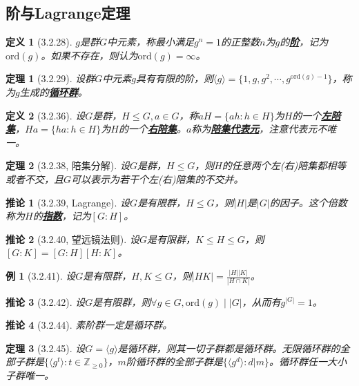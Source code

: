 \documentclass[landscape, a4paper]{article}
\theoremstyle{compact}
\newtheorem{theorem}{定理}
\newtheorem{example}{例}
\newtheorem{corollary}{推论}
\newtheorem{definition}{定义}
\def\obj#1{\textbf{\uline{#1}}}
\def\ord#1{\text{ord}({#1})}
\def\ge{\geqslant}
\begin{document}
\begin{multicols}{3}
\subsection{阶与Lagrange定理}
\begin{definition}[3.2.28]
	$g$是群$G$中元素，称最小满足$g^n=1$的正整数$n$为$g$的\obj{阶}，记为$\ord{g}$。如果不存在，则认为$\ord{g} = \infty$。
\end{definition}
\begin{theorem}[3.2.29]
	设群$G$中元素$g$具有有限的阶，则$\langle g \rangle = \{1, g, g^2, \cdots, g^{\ord{g}-1}\}$，称为$g$生成的\obj{循环群}。
\end{theorem}
\begin{definition}[3.2.36]
	设$G$是群，$H \leqslant G, a \in G$，称$aH = \{ah: h \in H\}$为$H$的一个\obj{左陪集}，$Ha = \{ha: h \in H\}$为$H$的一个\obj{右陪集}。$a$称为\obj{陪集代表元}，注意代表元不唯一。
\end{definition}
\begin{theorem}[3.2.38, 陪集分解]
	设$G$是群，$H \leqslant G$，则$H$的任意两个左(右)陪集都相等或者不交，且$G$可以表示为若干个左(右)陪集的不交并。
\end{theorem}
\begin{corollary}[3.2.39, Lagrange]
	设$G$是有限群，$H \leqslant G$，则$|H|$是$|G|$的因子。这个倍数称为$H$的\obj{指数}，记为$[G:H]$。
\end{corollary}
\begin{corollary}[3.2.40, 望远镜法则]
	设$G$是有限群，$K \leqslant H \leqslant G$，则$[G:K] = [G:H][H:K]$。
\end{corollary}
\begin{example}[3.2.41]
	设$G$是有限群，$H, K \leqslant G$，则$|HK| = \frac{|H||K|}{|H\cap K|}$。
\end{example}
\begin{corollary}[3.2.42]
	设$G$是有限群，则$\forall g \in G, \ord{g} \mid |G|$，从而有$g^{|G|} = 1$。
\end{corollary}
\begin{corollary}[3.2.44]
	素阶群一定是循环群。
\end{corollary}
\begin{theorem}[3.2.45]
	设$G = \langle g \rangle$是循环群，则其一切子群都是循环群。无限循环群的全部子群是$\{ \langle g^t \rangle: t \in \mathbb Z_{\ge 0}\}$，$m$阶循环群的全部子群是$\{\langle g^{d} \rangle: d | m\}$。循环群任一大小子群唯一。
\end{theorem}


\end{multicols}
\end{document}
